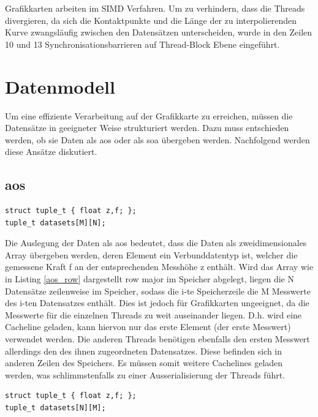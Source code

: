 Grafikkarten arbeiten im SIMD Verfahren. Um zu verhindern, dass die Threads divergieren, da sich die Kontaktpunkte und die Länge der zu interpolierenden Kurve zwangsläufig zwischen den Datensätzen unterscheiden, wurde in den Zeilen 10 und 13 Synchronisationsbarrieren auf Thread-Block Ebene eingeführt.

\section{Datenmodell}
Um eine effiziente Verarbeitung auf der Grafikkarte zu erreichen, müssen die Datensätze in geeigneter Weise strukturiert werden.
Dazu muss entschieden werden, ob sie Daten als \gls{aos} oder als \gls{soa} übergeben werden. Nachfolgend werden diese Ansätze diskutiert.

\subsection{\acrlong{aos}}
\begin{lstlisting}[label=aos_row,caption=Datenlayout \gls{aos} row major]
struct tuple_t { float z,f; };
tuple_t datasets[M][N];
\end{lstlisting}


Die Auslegung der Daten als \gls{aos} bedeutet, dass die Daten als zweidimensionales Array übergeben werden, deren Element ein Verbunddatentyp ist, welcher die gemessene Kraft f an der entsprechenden Messhöhe z enthält. Wird das Array wie in Listing \ref{aos_row} dargestellt row major im Speicher abgelegt, liegen die N Datensätze zeilenweise im Speicher, sodass die i-te Speicherzeile die M Messwerte des i-ten Datensatzes enthält.
Dies ist jedoch für Grafikkarten ungeeignet, da die Messwerte für die einzelnen Threads zu weit auseinander liegen. D.h. wird eine Cacheline geladen, kann hiervon nur das erste Element (der erste Messwert) verwendet werden. Die anderen Threads benötigen ebenfalls den ersten Messwert allerdings den des ihnen zugeordneten Datensatzes. Diese befinden sich in anderen Zeilen des Speichers.
Es müssen somit weitere Cachelines geladen werden, was schlimmstenfalls zu einer Ausserialisierung der Threads führt.


\begin{lstlisting}[label=aos_col,caption=Datenlayout \gls{aos} column major]
struct tuple_t { float z,f; };
tuple_t datasets[N][M];
\end{lstlisting}

